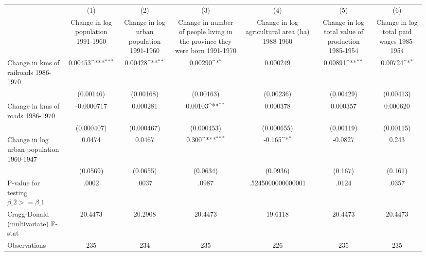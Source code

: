 {
\def\sym#1{\ifmmode^{#1}\else\(^{#1}\)\fi}
\begin{tabular}{l*{6}{c}}
\hline\hline
                &\multicolumn{1}{c}{(1)}&\multicolumn{1}{c}{(2)}&\multicolumn{1}{c}{(3)}&\multicolumn{1}{c}{(4)}&\multicolumn{1}{c}{(5)}&\multicolumn{1}{c}{(6)}\\
                &\multicolumn{1}{c}{Change in log population 1991-1960}&\multicolumn{1}{c}{Change in log urban population 1991-1960}&\multicolumn{1}{c}{Change in number of people living in the province they were born 1991-1970}&\multicolumn{1}{c}{Change in log agricultural area (ha) 1988-1960}&\multicolumn{1}{c}{Change in log total value of production 1985-1954}&\multicolumn{1}{c}{Change in log total paid wages 1985-1954}\\
\hline
Change in kms of railroads 1986-1970&  0.00453\sym{***}&  0.00428\sym{**} &  0.00290\sym{*}  & 0.000249         &  0.00891\sym{**} &  0.00724\sym{*}  \\
                &(0.00146)         &(0.00168)         &(0.00163)         &(0.00236)         &(0.00429)         &(0.00413)         \\
[1em]
Change in kms of roads 1986-1970&-0.0000717         & 0.000281         &  0.00103\sym{**} & 0.000378         & 0.000357         & 0.000620         \\
                &(0.000407)         &(0.000467)         &(0.000453)         &(0.000655)         &(0.00119)         &(0.00115)         \\
[1em]
Change in log urban population 1960-1947&   0.0474         &   0.0467         &    0.300\sym{***}&   -0.165\sym{*}  &  -0.0827         &    0.243         \\
                & (0.0569)         & (0.0655)         & (0.0634)         & (0.0936)         &  (0.167)         &  (0.161)         \\
\hline
P-value for testing $\beta\_{2} >= \beta\_{1}$&    .0002         &    .0037         &    .0987         &.5245000000000001         &    .0124         &    .0357         \\
Cragg-Donald (multivariate) F-stat&  20.4473         &  20.2908         &  20.4473         &  19.6118         &  20.4473         &  20.4473         \\
Observations    &      235         &      234         &      235         &      226         &      235         &      235         \\
\hline\hline
\end{tabular}
}
